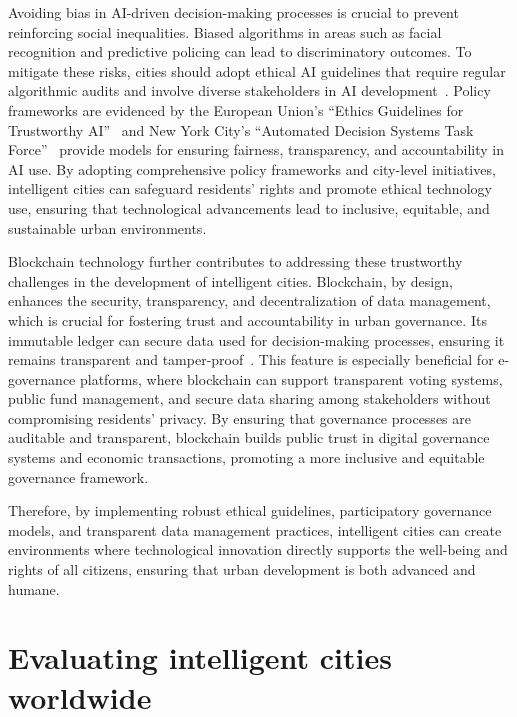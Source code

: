 \documentclass[smartcities,article,submit,pdftex,moreauthors]{Definitions/mdpi}
\begin{document}
Avoiding bias in AI-driven decision-making processes is crucial to prevent reinforcing social inequalities. Biased algorithms in areas such as facial recognition and predictive policing can lead to discriminatory outcomes. To mitigate these risks, cities should adopt ethical AI guidelines that require regular algorithmic audits and involve diverse stakeholders in AI development~\cite{EthicsSmartCityAI}. Policy frameworks are evidenced by the European Union's ``Ethics Guidelines for Trustworthy AI''~\cite{TrustworthyAIReview} and New York City's ``Automated Decision Systems Task Force''~\cite{ParticipatoryGovernanceNYC} provide models for ensuring fairness, transparency, and accountability in AI use. By adopting comprehensive policy frameworks and city-level initiatives, intelligent cities can safeguard residents' rights and promote ethical technology use, ensuring that technological advancements lead to inclusive, equitable, and sustainable urban environments.

Blockchain technology further contributes to addressing these trustworthy challenges in the development of intelligent cities. Blockchain, by design, enhances the security, transparency, and decentralization of data management, which is crucial for fostering trust and accountability in urban governance. Its immutable ledger can secure data used for decision-making processes, ensuring it remains transparent and tamper-proof~\cite{TechnologiesSolutionsSecurity,BlockchainSustainability}. This feature is especially beneficial for e-governance platforms, where blockchain can support transparent voting systems, public fund management, and secure data sharing among stakeholders without compromising residents' privacy. By ensuring that governance processes are auditable and transparent, blockchain builds public trust in digital governance systems and economic transactions, promoting a more inclusive and equitable governance framework. 

Therefore, by implementing robust ethical guidelines, participatory governance models, and transparent data management practices, intelligent cities can create environments where technological innovation directly supports the well-being and rights of all citizens, ensuring that urban development is both advanced and humane.



\section{Evaluating intelligent cities worldwide}
\label{sec:comp}
\end{document}
